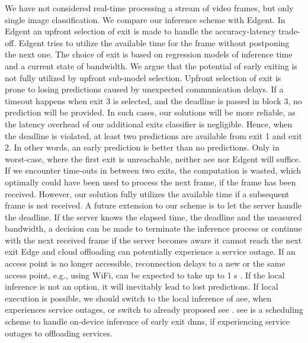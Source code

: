 We have not considered real-time processing a stream of video frames, but only single image classification. We compare our inference scheme with Edgent. In Edgent an upfront selection of exit is made to handle the accuracy-latency trade-off. Edgent tries to utilize the available time for the frame without postponing the next one. The choice of exit is based on regression models of inference time and a current state of bandwidth.  We argue that the potential of early exiting is not fully utilized by upfront sub-model selection. Upfront selection of exit is prone to losing predictions caused by unexpected communication delays. If a timeout happens when exit 3 is selected, and the deadline is passed in block 3, no prediction will be provided.  In such cases, our solutions will be more reliable, as the latency overhead of our additional exits classifier is negligible. Hence, when the deadline is violated, at least two predictions are available from exit 1 and exit 2. In other words, an early prediction is better than no predictions. Only in worst-case, where the first exit is unreachable, neither \gls{aee} nor Edgent will suffice. 
If we encounter time-outs in between two exits, the computation is wasted, which optimally could have been used to process the next frame, if the frame has been received. However, our solution fully utilizes the available time if a subsequent frame is not received. A future extension to our scheme is to let the server handle the deadline. If the server knows the elapsed time, the deadline and the measured bandwidth, a decision can be made to terminate the inference process or continue with the next received frame if the server becomes aware it cannot reach the next exit  
Edge and cloud offloading can potentially experience a service outage. If an access point is no longer accessible, reconnection delays to a new or the same access point, e.g., using WiFi, can be expected to take up to 1 s \cite{pei_why_2017}. If the local inference is not an option, it will inevitably lead to lost predictions. If local execution is possible, we should switch to the local inference of \gls{aee}, when experiences service outages, or switch to already proposed \gls{see} \cite{wang_see:_2019}. \gls{see} is a scheduling scheme to handle on-device inference of early exit \gls{dnn}s, if experiencing service outages to offloading services. 
